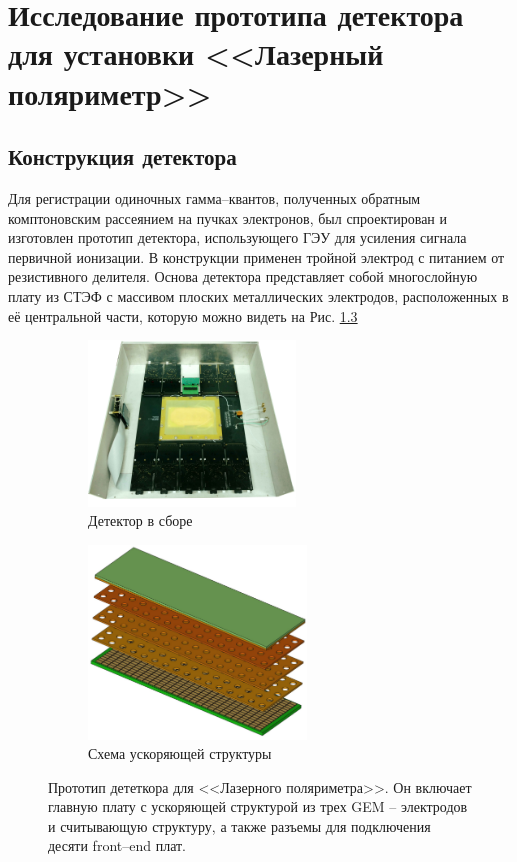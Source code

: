 \chapter{Исследование прототипа детектора для установки <<Лазерный поляриметр>>}
\label{sec:pol_examine}
\section{Конструкция детектора}
Для регистрации одиночных гамма--квантов, полученных обратным комптоновским рассеянием на пучках электронов, был спроектирован и изготовлен прототип детектора, использующего ГЭУ для усиления сигнала первичной ионизации. В конструкции применен тройной электрод с питанием от резистивного делителя. Основа детектора представляет собой многослойную плату из СТЭФ с массивом плоских металлических электродов, расположенных в её центральной части, которую можно видеть на Рис. \ref{fig:Detector_full_fig} 
\begin{figure}[H]
	\centering
	\begin{subfigure}{.5\textwidth}
		\centering
		\includegraphics[height = 5 cm, width= 5.5cm]{img/GEM_prototype.jpg}
		\caption{Детектор в сборе}
		\label{fig:Detector}
	\end{subfigure}%
	\begin{subfigure}{.5\textwidth}
		\centering
		\includegraphics[height = 5 cm, width= 5.8cm]{img/GEM_model.pdf}
		\caption{Схема ускоряющей структуры}
		\label{fig:GEM_structure}
	\end{subfigure}
	\caption{Прототип дететкора для <<Лазерного поляриметра>>. Он включает главную плату с ускоряющей структурой из трех GEM -- электродов и считывающую структуру, а также разъемы для подключения десяти front--end плат.}
	\label{fig:Detector_full_fig}
\end{figure}
